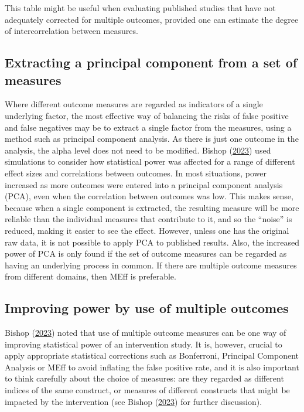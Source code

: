 \documentclass{krantz}
\begin{document}
This table might be useful when evaluating published studies that have not adequately corrected for multiple outcomes, provided one can estimate the degree of intercorrelation between measures.

\hypertarget{extracting-a-principal-component-from-a-set-of-measures}{%
\subsection{Extracting a principal component from a set of measures}\label{extracting-a-principal-component-from-a-set-of-measures}}

Where different outcome measures are regarded as indicators of a single underlying factor, the most effective way of balancing the risks of false positive and false negatives may be to extract a single factor from the measures, using a method such as principal component analysis. As there is just one outcome in the analysis, the alpha level does not need to be modified. Bishop (\protect\hyperlink{ref-bishop2023b}{2023}) used simulations to consider how statistical power was affected for a range of different effect sizes and correlations between outcomes. In most situations, power increased as more outcomes were entered into a principal component analysis (PCA), even when the correlation between outcomes was low. This makes sense, because when a single component is extracted, the resulting measure will be more reliable than the individual measures that contribute to it, and so the ``noise'' is reduced, making it easier to see the effect. However, unless one has the original raw data, it is not possible to apply PCA to published results. Also, the increased power of PCA is only found if the set of outcome measures can be regarded as having an underlying process in common. If there are multiple outcome measures from different domains, then MEff is preferable.

\hypertarget{improving-power-by-use-of-multiple-outcomes}{%
\subsection{Improving power by use of multiple outcomes}\label{improving-power-by-use-of-multiple-outcomes}}

Bishop (\protect\hyperlink{ref-bishop2023b}{2023}) noted that use of multiple outcome measures can be one way of improving statistical power of an intervention study. It is, however, crucial to apply appropriate statistical corrections such as Bonferroni, Principal Component Analysis or MEff to avoid inflating the false positive rate, and it is also important to think carefully about the choice of measures: are they regarded as different indices of the same construct, or measures of different constructs that might be impacted by the intervention (see Bishop (\protect\hyperlink{ref-bishop2023b}{2023}) for further discussion).
\end{document}
